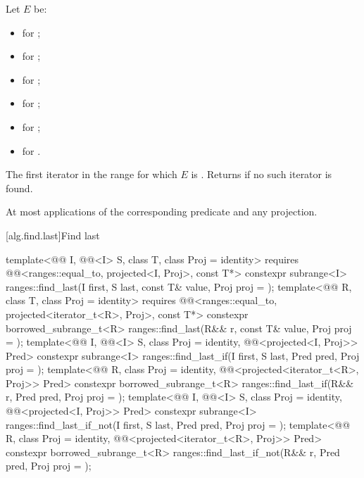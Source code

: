 \begin{itemdescr}
\pnum
Let $E$ be:
\begin{itemize}
\item {} for ;
\item {} for ;
\item {} for ;
\item {} for ;
\item {} for ;
\item {} for .
\end{itemize}

\pnum
\returns
The first iterator  in the range 
for which $E$ is .
Returns  if no such iterator is found.

\pnum
\complexity
At most  applications
of the corresponding predicate and any projection.
\end{itemdescr}

[alg.find.last]{Find last}

%
\begin{itemdecl}
template<@@ I, @@<I> S, class T, class Proj = identity>
  requires @@<ranges::equal_to, projected<I, Proj>, const T*>
  constexpr subrange<I> ranges::find_last(I first, S last, const T& value, Proj proj = {});
template<@@ R, class T, class Proj = identity>
  requires @@<ranges::equal_to, projected<iterator_t<R>, Proj>, const T*>
  constexpr borrowed_subrange_t<R> ranges::find_last(R&& r, const T& value, Proj proj = {});
template<@@ I, @@<I> S, class Proj = identity,
         @@<projected<I, Proj>> Pred>
  constexpr subrange<I> ranges::find_last_if(I first, S last, Pred pred, Proj proj = {});
template<@@ R, class Proj = identity,
         @@<projected<iterator_t<R>, Proj>> Pred>
  constexpr borrowed_subrange_t<R> ranges::find_last_if(R&& r, Pred pred, Proj proj = {});
template<@@ I, @@<I> S, class Proj = identity,
         @@<projected<I, Proj>> Pred>
  constexpr subrange<I> ranges::find_last_if_not(I first, S last, Pred pred, Proj proj = {});
template<@@ R, class Proj = identity,
         @@<projected<iterator_t<R>, Proj>> Pred>
  constexpr borrowed_subrange_t<R> ranges::find_last_if_not(R&& r, Pred pred, Proj proj = {});
\end{itemdecl}

